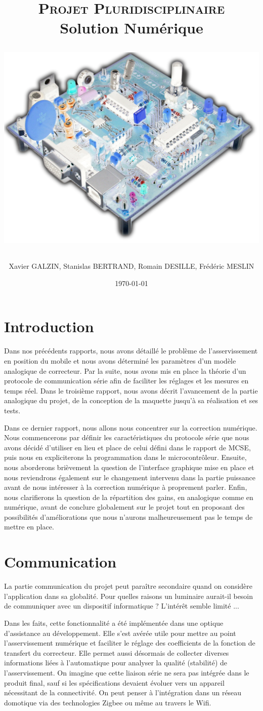 \documentclass[11pt, french]{article} %
\title{\textsc{Projet Pluridisciplinaire} \\ Solution Numérique \\
\begin{minipage}[c][20cm][c]{15cm}
\includegraphics[width=15cm]{../Photos/CarteFrontInv.png}
\end{minipage}}
\author{Xavier GALZIN, Stanislas BERTRAND, Romain DESILLE, Frédéric MESLIN}
\date{\today}
\begin{document}
\maketitle

\pagebreak
\tableofcontents

\pagebreak
\section*{Introduction}

Dans nos précédents rapports, nous avons détaillé le problème de l'asservissement en position du mobile et nous avons déterminé les paramètres d'un modèle analogique de correcteur. Par la suite, nous avons mis en place la théorie d'un protocole de communication série afin de faciliter les réglages et les mesures en temps réel. Dans le troisième rapport, nous avons décrit l'avancement de la partie analogique du projet, de la conception de la maquette jusqu'à sa réalisation et ses tests. 

\medskip

Dans ce dernier rapport, nous allons nous concentrer sur la correction numérique. Nous commencerons par définir les caractéristiques du protocole série que nous avons décidé d'utiliser en lieu et place de celui défini dans le rapport de MCSE, puis nous en expliciterons la programmation dans le microcontrôleur. Ensuite, nous aborderons brièvement la question de l'interface graphique mise en place et nous reviendrons également sur le changement intervenu dans la partie puissance avant de nous intéresser à la correction numérique à proprement parler. Enfin, nous clarifierons la question de la répartition des gains, en analogique comme en numérique, avant de conclure globalement sur le projet tout en proposant des possibilités d'améliorations que nous n'aurons malheureusement pas le temps de mettre en place. 


\section{Communication}
	La partie communication du projet peut paraître secondaire quand on considère l'application dans sa globalité. Pour quelles raisons un luminaire aurait-il besoin de communiquer avec un dispositif informatique ? L'intérêt semble limité ...

\medskip
Dans les faits, cette fonctionnalité a été implémentée dans une optique d'assistance au développement. Elle s'est avérée utile pour mettre au point l'asservissement numérique et faciliter le réglage des coefficients de la fonction de transfert du correcteur. Elle permet aussi désormais de collecter diverses informations liées à l'automatique pour analyser la qualité (stabilité) de l'asservissement. On imagine que cette liaison série ne sera pas intégrée dans le produit final, sauf si les spécifications devaient évoluer vers un appareil nécessitant de la connectivité. On peut penser à l'intégration dans un réseau domotique via des technologies Zigbee ou même au travers le Wifi.
\end{document}
